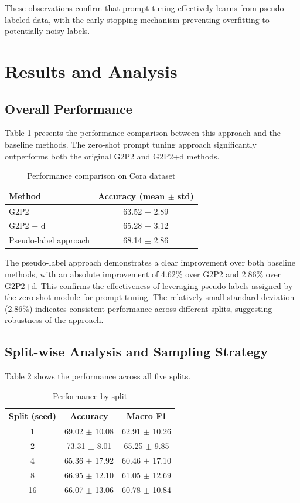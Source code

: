 \documentclass[10pt,conference]{IEEEtran}
\begin{document}
These observations confirm that prompt tuning effectively learns from pseudo-labeled data, with the early stopping mechanism preventing overfitting to potentially noisy labels.

\section{Results and Analysis}

\subsection{Overall Performance}

Table \ref{tab:overall-results} presents the performance comparison between this approach and the baseline methods. The zero-shot prompt tuning approach significantly outperforms both the original G2P2 and G2P2+d methods.

\begin{table}[h]
\centering
\caption{Performance comparison on Cora dataset}
\label{tab:overall-results}
\begin{tabular}{lc}
\toprule
\textbf{Method} & \textbf{Accuracy (mean $\pm$ std)} \\
\midrule
G2P2 & 63.52 $\pm$ 2.89 \\
G2P2 + d & 65.28 $\pm$ 3.12 \\
Pseudo-label approach & 68.14 $\pm$ 2.86 \\
\bottomrule
\end{tabular}
\end{table}

The pseudo-label approach demonstrates a clear improvement over both baseline methods, with an absolute improvement of 4.62\% over G2P2 and 2.86\% over G2P2+d. This confirms the effectiveness of leveraging pseudo labels assigned by the zero-shot module for prompt tuning. The relatively small standard deviation (2.86\%) indicates consistent performance across different splits, suggesting robustness of the approach.

\subsection{Split-wise Analysis and Sampling Strategy}

Table \ref{tab:split-results} shows the performance across all five splits.

\begin{table}[h]
\centering
\caption{Performance by split}
\label{tab:split-results}
\begin{tabular}{ccc}
\toprule
\textbf{Split (seed)} & \textbf{Accuracy} & \textbf{Macro F1} \\
\midrule
1 & 69.02 $\pm$ 10.08 & 62.91 $\pm$ 10.26 \\
2 & 73.31 $\pm$ 8.01 & 65.25 $\pm$ 9.85 \\
4 & 65.36 $\pm$ 17.92 & 60.46 $\pm$ 17.10 \\
8 & 66.95 $\pm$ 12.10 & 61.05 $\pm$ 12.69 \\
16 & 66.07 $\pm$ 13.06 & 60.78 $\pm$ 10.84 \\
\bottomrule
\end{tabular}
\end{table}
\end{document}

